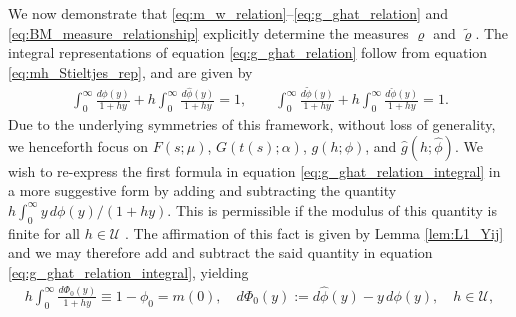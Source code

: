 \documentclass[english,12pt,jmp,graphicx]{revtex4-1}
\newcommand{\ph}{\hat{\phi}}
\newcommand{\pt}{\tilde{\phi}}
\newcommand{\pc}{\check{\phi}}
\begin{document}
We now demonstrate that \eqref{eq:m_w_relation}--\eqref{eq:g_ghat_relation}
and \eqref{eq:BM_measure_relationship} explicitly determine the
measures $\varrho$ and $\tilde{\varrho}$. The integral representations of equation
\eqref{eq:g_ghat_relation} follow from equation
\eqref{eq:mh_Stieltjes_rep}, and are given by  
%
\begin{align}\label{eq:g_ghat_relation_integral}
  \int_0^\infty\frac{d\phi(y)}{1+hy}+h\int_0^\infty\frac{d\ph(y)}{1+hy}=1,\qquad
  \int_0^\infty\frac{d\pt(y)}{1+hy}+h\int_0^\infty\frac{d\pc(y)}{1+hy}=1.
\end{align}
%
Due to the underlying symmetries of this framework, without loss of
generality, we henceforth focus on $F(s;\mu)$, $G(t(s);\alpha)$, $g(h;\phi)$,
and $\hat{g}(h;\ph)$. We wish to re-express the first formula in
equation \eqref{eq:g_ghat_relation_integral} in a more suggestive form
by adding and subtracting the quantity
$h\int_0^\infty y\,d\phi(y)/(1+hy)$. This is permissible if the modulus of
this quantity is finite for all $h\in\mathcal{U}$
\cite{Rudin:87,Folland:95}. The affirmation of this fact is given by
Lemma \ref{lem:L1_Yij} and we may therefore add and
subtract the said quantity in equation \eqref{eq:g_ghat_relation_integral}, yielding   
%
%
\begin{align}\label{eq:n=0_measure_equivalence}
 h \int_0^\infty\frac{d\Phi_0(y)}{1+hy}\equiv1-\phi_0=m(0),  \quad
 d\Phi_0(y):=d\ph(y)-y\,d\phi(y), \quad
 h\in\mathcal{U},
\end{align}
\end{document}
